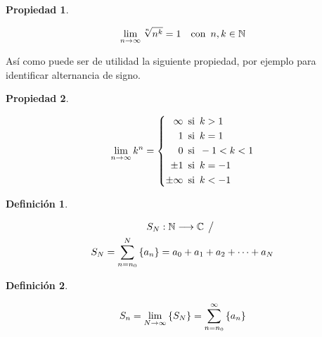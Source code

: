 \documentclass[a5paper,12pt,twoside]{book}
\newtheorem{defn}{{Definición}}[chapter]
\newtheorem{prop}{{Propiedad}}[chapter]
\begin{document}
\begin{mdframed}[style=MyFrame1]
    \begin{prop}
    \end{prop}
    \begin{equation*}
        \lim_{n\to\infty} \sqrt[n]{n^k} = 1 \quad \textrm{con} \enspace n, k \in \mathbb{N}
    \end{equation*}
\end{mdframed}

Así como puede ser de utilidad la siguiente propiedad, por ejemplo para identificar alternancia de signo.

\begin{mdframed}[style=MyFrame1]
    \begin{prop}
    \end{prop}
    \begin{equation*}
        \lim_{n\to\infty} k^n =
        \left\{
        \begin{aligned}
            \infty \enspace & \textrm{si} \enspace k>1
            \\
            1 \enspace & \textrm{si} \enspace k=1
            \\
            0 \enspace & \textrm{si} \enspace -1<k<1
            \\
            \pm 1 \enspace & \textrm{si} \enspace k = -1
            \\
            \pm \infty \enspace & \textrm{si} \enspace k<-1
        \end{aligned}
        \right.
    \end{equation*}
\end{mdframed}

\begin{mdframed}[style=MyFrame1]
    \begin{defn}
    \end{defn}
    \begin{gather*}
        S_N: \mathbb{N} \longrightarrow \mathbb{C} \hspace{1ex} \big/ \hspace{1ex}
        \\
        S_N = \sum_{n=n_0}^N { \left\{ {a_n} \right\} } = a_0 + a_1 + a_2 + \dots + a_N
    \end{gather*}
\end{mdframed}

\begin{mdframed}[style=MyFrame1]
    \begin{defn}
    \end{defn}
    \begin{equation*}
        S_n = \lim_{N \to \infty} { \left\{ {S_N} \right\} } = \sum_{n=n_0}^ \infty { \left\{ {a_n} \right\} }
    \end{equation*}
\end{mdframed}
\end{document}
